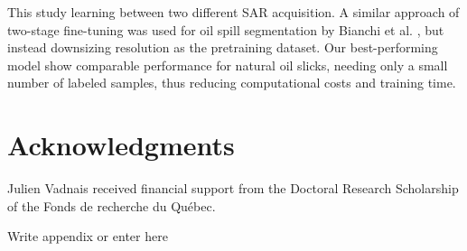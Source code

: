 \documentclass[journal]{IEEEtran}
\begin{document}


This study learning between two different SAR acquisition.
A similar approach of two-stage fine-tuning was used for oil spill segmentation by Bianchi et al. \cite{bianchiLargeScaleDetectionCategorization2020a}, but instead downsizing resolution as the pretraining dataset.
Our best-performing model show comparable performance for natural oil slicks, needing only a small number of labeled samples, thus reducing computational costs and training time.

\section*{Acknowledgments}
Julien Vadnais received financial support from the Doctoral Research Scholarship of the Fonds de recherche du Québec.

{\appendix[Appendix A]
Write appendix or enter here
}



\end{document}
